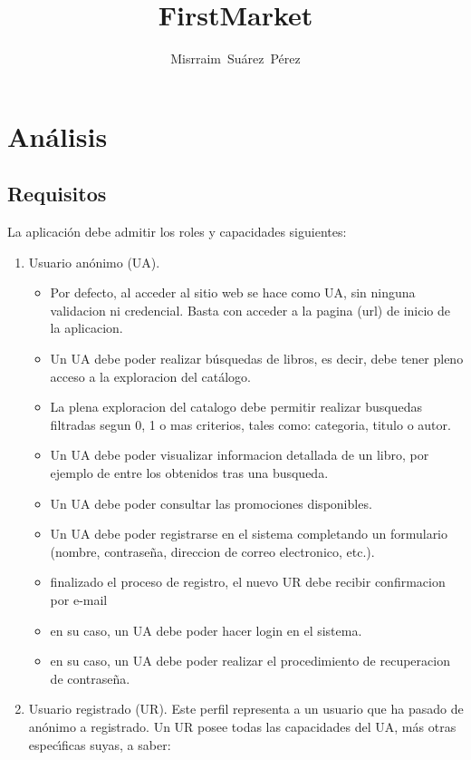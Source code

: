 \documentclass[a4paper,11pt]{report}
\author{Misrraim~Su\'arez~P\'erez}
\title{FirstMarket}
\begin{document}
    \maketitle
    \tableofcontents

    \section{An\'alisis}
    \subsection{Requisitos}
    La aplicaci\'on debe admitir los roles y capacidades siguientes:
    \begin{enumerate}
        \item Usuario an\'onimo (UA).
        \begin{itemize}
            \item Por defecto, al acceder al sitio web se hace como UA, sin ninguna validacion ni credencial. Basta con acceder a la pagina (url) de inicio de la aplicacion.
            \item Un UA debe poder realizar b\'usquedas de libros, es decir, debe tener pleno acceso a la exploracion del cat\'alogo.
            \item La plena exploracion del catalogo debe permitir realizar busquedas filtradas segun 0, 1 o mas criterios, tales como: categoria, titulo o autor.
            \item Un UA debe poder visualizar informacion detallada de un libro, por ejemplo de entre los obtenidos tras una busqueda.
            \item Un UA debe poder consultar las promociones disponibles.
            \item Un UA debe poder registrarse en el sistema completando un formulario (nombre, contrase\~na, direccion de correo electronico, etc.).
            \item finalizado el proceso de registro, el nuevo UR debe recibir confirmacion por e-mail
            \item en su caso, un UA debe poder hacer login en el sistema.
            \item en su caso, un UA debe poder realizar el procedimiento de recuperacion de contrase\~na.
        \end{itemize}
        \item Usuario registrado (UR). Este perfil representa a un usuario que ha pasado de an\'onimo a registrado. Un UR posee todas las capacidades del UA, m\'as otras espec\'\i{}ficas suyas, a saber:

\end{enumerate}
\end{document}
